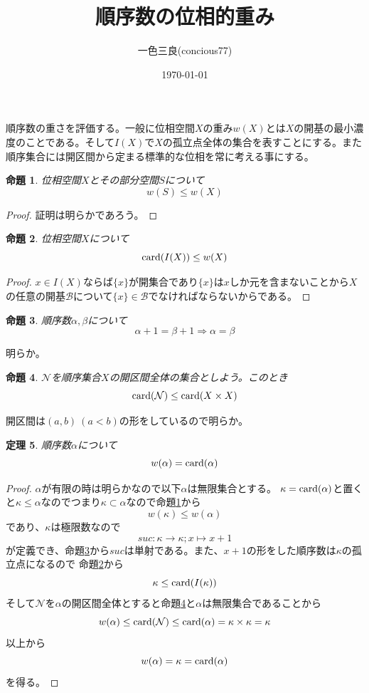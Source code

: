 \documentclass[leqno]{jsarticle}
\title{順序数の位相的重み}
\author{一色三良(concious77)}
\date{\today}
\newtheorem{thm}{定理}
\newtheorem{prop}[thm]{命題}
\newcommand{\To}{\Longrightarrow}
\newcommand{\card}{\text{{\rm card}}}
\newcommand{\al}{\alpha}
\begin{document}
\maketitle

順序数の重さを評価する。一般に位相空間$X$の重み$w(X)$とは$X$の開基の最小濃度のことである。そして$I(X)$で$X$の孤立点全体の集合を表すことにする。また順序集合には開区間から定まる標準的な位相を常に考える事にする。
\begin{prop}\label{1}
位相空間$X$とその部分空間$S$について
\[
w(S)\le w(X)
\]
\end{prop}
\begin{proof}
証明は明らかであろう。
\end{proof}

\begin{prop}\label{2}
位相空間$X$について
\[
\card(I(X))\le w(X)
\]
\end{prop}
\begin{proof}
$x\in I(X)$ならば$\{x\}$が開集合であり$\{x\}$は$x$しか元を含まないことから$X$の任意の開基$\mathcal{B}$について$\{x\}\in \mathcal{B}$でなければならないからである。
\end{proof}

\begin{prop}\label{3}
順序数$\alpha,\beta$について
\[
\alpha+1=\beta+1\To \alpha=\beta
\]
\end{prop}
{\proof 明らか。}

\begin{prop}\label{4}
$\mathcal{N}$を順序集合$X$の開区間全体の集合としよう。このとき
\[
\card (\mathcal{N})\le \card(X\times X)
\]
\end{prop}
{\proof 開区間は$(a,b)\ (a<b)$の形をしているので明らか。}


\begin{thm}
順序数$\al$について
\[
w(\al)=\card(\al)
\]
\end{thm}

\begin{proof}$\al$が有限の時は明らかなので以下$\al$は無限集合とする。
$\kappa=\card(\al)$と置くと$\kappa \le\al$なのでつまり$\kappa \subset \al$なので命題\ref{1}から
\[
w(\kappa)\le w(\al)
\]
であり、$\kappa$は極限数なので
\[
suc:\kappa\to \kappa;x\mapsto x+1
\]
が定義でき、命題\ref{3}から$suc$は単射である。また、$x+1$の形をした順序数は$\kappa$の孤立点になるので
命題\ref{2}から
\[
\kappa \le \card(I(\kappa))
\]
そして$\mathcal{N}$を$\al$の開区間全体とすると命題\ref{4}と$\al$は無限集合であることから
\[
w(\al)\le \card(\mathcal{N})\le \card(\al)=\kappa\times \kappa =\kappa
\]
以上から
\[
w(\al)=\kappa=\card(\al)
\]
を得る。
\end{proof}















			
\end{document}
